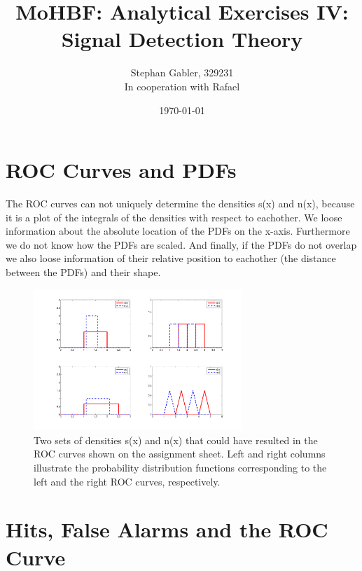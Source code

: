 \documentclass[a4paper]{scrartcl}
\title{MoHBF: Analytical Exercises IV: Signal Detection Theory}
\author{Stephan Gabler, 329231 \\ In cooperation with Rafael}
\date{\today}
\begin{document}
\maketitle
\section{ROC Curves and PDFs}

The ROC curves can not uniquely determine the densities s(x) and n(x), because it is a plot of the integrals of the densities with respect to eachother. We loose information about the absolute location of the PDFs on the x-axis. Furthermore we do not know how the PDFs are scaled. And finally, if the PDFs do not overlap we also loose information of their relative position to eachother (the distance between the PDFs) and their shape. 

\begin{figure}[ht]
	\centering
		\includegraphics[width=0.7\textwidth]{pdfs.pdf}
			\caption{Two sets of densities s(x) and n(x) that could have resulted in the ROC curves shown on the assignment sheet. Left and right columns illustrate the probability distribution functions corresponding to the left and the right ROC curves, respectively.}
\label{sg:fig:pdfs}
\end{figure}

\clearpage

\section{Hits, False Alarms and the ROC Curve}
\end{document}
